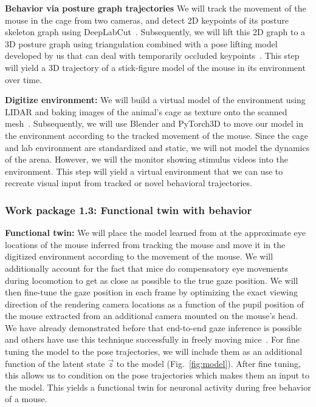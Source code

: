 \documentclass[B2,COG]{ercgrant}
\begin{document}
\textbf{Behavior via posture graph trajectories}
We will track the movement of the mouse in the cage from two cameras, and detect 2D keypoints of its posture skeleton graph using DeepLabCut~\parencite{Mathis2018-lk}. 
Subsequently, we will lift this 2D graph to a 3D posture graph using triangulation combined with a pose lifting model developed by us that can deal with temporarily occluded keypoints~\parencite{Pierzchlewicz2022-tq}. 
This step will yield a 3D trajectory of a stick-figure model of the mouse in its environment over time. 

\textbf{Digitize environment:} 
We will build a virtual model of the environment using LIDAR and baking images of the animal's cage as texture onto the scanned mesh~\parencite[similar as in][]{Holmgren2021-jv}.
Subsequently, we will use Blender and PyTorch3D to move our model in the environment according to the tracked movement of the mouse.
Since the cage and lab environment are standardized and static, we will not model the dynamics of the arena. 
However, we will the monitor showing stimulus videos into the environment. 
This step will yield a virtual environment that we can use to recreate visual input from tracked or novel behavioral trajectories.


\subsubsection{Work package 1.3: Functional twin with behavior\hfill{}}

\textbf{Functional twin:} We will place the model learned from  at the approximate eye locations of the mouse inferred from tracking the mouse and move it in the digitized environment according to the movement of the mouse. 
We will additionally account for the fact that mice do compensatory eye movements during locomotion\parencite[similar to rats][]{Wallace2013-lf} to get as close as possible to the true gaze position. 
We will then fine-tune the gaze position in each frame by optimizing the exact viewing direction of the rendering camera locations as a function of the pupil position of the mouse extracted from an additional camera mounted on the mouse's head.
We have already demonstrated before that end-to-end gaze inference is possible~\parencite{Sinz2018-sk,Walker2019-yw} and others have use this technique successfully in freely moving mice~\parencite{Parker2022-ac}.
For fine tuning the model to the pose trajectories, we will include them as an additional function of the latent state $\vec{z}$ to the model (Fig.~\ref{fig:model}). 
After fine tuning, this allows us to condition on the pose trajectories which makes them an input to the model. 
This yields a functional twin for neuronal activity during free behavior of a mouse.
\end{document}
